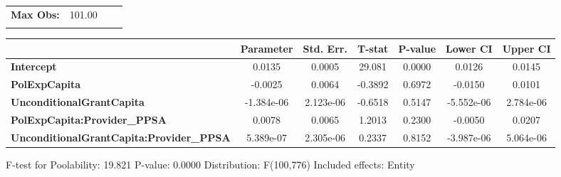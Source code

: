\begin{center}
\begin{tabular}{lclc}
\textbf{Max Obs:}                                &       101.00       & \textbf{                     }   &                  \\
\textbf{}                                        &                    & \textbf{                     }   &                  \\
\bottomrule
\end{tabular}
\begin{tabular}{lcccccc}
                                                 & \textbf{Parameter} & \textbf{Std. Err.} & \textbf{T-stat} & \textbf{P-value} & \textbf{Lower CI} & \textbf{Upper CI}  \\
\midrule
\textbf{Intercept}                               &       0.0135       &       0.0005       &      29.081     &      0.0000      &       0.0126      &       0.0145       \\
\textbf{PolExpCapita}                            &      -0.0025       &       0.0064       &     -0.3892     &      0.6972      &      -0.0150      &       0.0101       \\
\textbf{UnconditionalGrantCapita}                &     -1.384e-06     &     2.123e-06      &     -0.6518     &      0.5147      &     -5.552e-06    &     2.784e-06      \\
\textbf{PolExpCapita:Provider\_PPSA}             &       0.0078       &       0.0065       &      1.2013     &      0.2300      &      -0.0050      &       0.0207       \\
\textbf{UnconditionalGrantCapita:Provider\_PPSA} &     5.389e-07      &     2.305e-06      &      0.2337     &      0.8152      &     -3.987e-06    &     5.064e-06      \\
\bottomrule
\end{tabular}
\end{center}

F-test for Poolability: 19.821 \newline
 P-value: 0.0000 \newline
 Distribution: F(100,776) \newline
  \newline
 Included effects: Entity